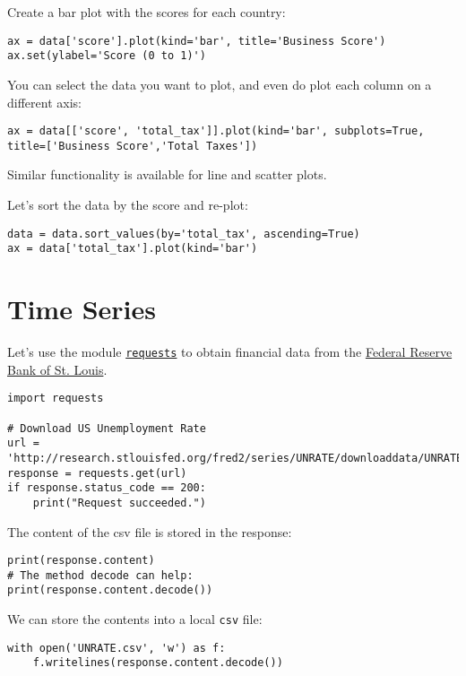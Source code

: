 \documentclass[12pt, a4paper]{article}
\begin{document}
Create a bar plot with the scores for each country:
\lstset{language=jupyter-python,label= ,caption= ,captionpos=b,numbers=none}
\begin{lstlisting}
ax = data['score'].plot(kind='bar', title='Business Score')
ax.set(ylabel='Score (0 to 1)')
\end{lstlisting}

You can select the data you want to plot, and even do plot each column on a different axis:
\lstset{language=jupyter-python,label= ,caption= ,captionpos=b,numbers=none}
\begin{lstlisting}
ax = data[['score', 'total_tax']].plot(kind='bar', subplots=True, title=['Business Score','Total Taxes'])
\end{lstlisting}

Similar functionality is available for line and scatter plots.

Let's sort the data by the score and re-plot:
\lstset{language=jupyter-python,label= ,caption= ,captionpos=b,numbers=none}
\begin{lstlisting}
data = data.sort_values(by='total_tax', ascending=True)
ax = data['total_tax'].plot(kind='bar')
\end{lstlisting}
\section{Time Series}
\label{sec:org7f5d1ed}
Let's use the module \href{https://2.python-requests.org/en/master/}{\texttt{requests}} to obtain financial data from the \href{https://fred.stlouisfed.org}{Federal Reserve Bank of St. Louis}.
\lstset{language=jupyter-python,label= ,caption= ,captionpos=b,numbers=none}
\begin{lstlisting}
import requests

# Download US Unemployment Rate
url = 'http://research.stlouisfed.org/fred2/series/UNRATE/downloaddata/UNRATE.csv'
response = requests.get(url)
if response.status_code == 200:
    print("Request succeeded.")
\end{lstlisting}

The content of the csv file is stored in the response:
\lstset{language=jupyter-python,label= ,caption= ,captionpos=b,numbers=none}
\begin{lstlisting}
print(response.content)
# The method decode can help:
print(response.content.decode())
\end{lstlisting}
We can store the contents into a local \texttt{csv} file:
\lstset{language=jupyter-python,label= ,caption= ,captionpos=b,numbers=none}
\begin{lstlisting}
with open('UNRATE.csv', 'w') as f:
    f.writelines(response.content.decode())
\end{lstlisting}
\end{document}
